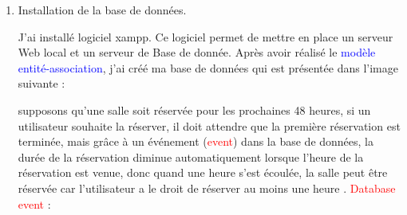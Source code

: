 \documentclass{article}
\begin{document}
\begin{enumerate}
\begin{enumerate}
               
               
               
                \vspace{1.6cm}
                 \item \textcolor{amethyst}{Installation de la base de données}.
           \vspace{0.4cm}
           
           
            \setlength{\parindent}{1cm}  J'ai installé logiciel xampp. Ce logiciel permet de mettre en place un serveur Web local et un serveur de Base de donnée. Après avoir réalisé le \textcolor{blue}{modèle entité-association}, j'ai créé ma base de données qui est présentée dans l'image suivante :
            
            
            
            \hspace*{-1.05in}
               \noindent{}
         
         
	 \vspace{0.4cm}
           
           
            \setlength{\parindent}{1cm} supposons qu'une salle soit réservée pour les prochaines 48 heures, si un utilisateur souhaite la réserver, il doit attendre que la première réservation est terminée, mais grâce à un événement (\textcolor{red}{event}) dans la base de données, la durée de la réservation diminue automatiquement lorsque l'heure de la réservation est venue, donc quand une heure s'est écoulée, la salle peut être réservée car l'utilisateur a le droit de réserver au moins une heure .
	\textcolor{red}{Database event} :        
         

\end{enumerate}
\end{enumerate}
\end{document}
